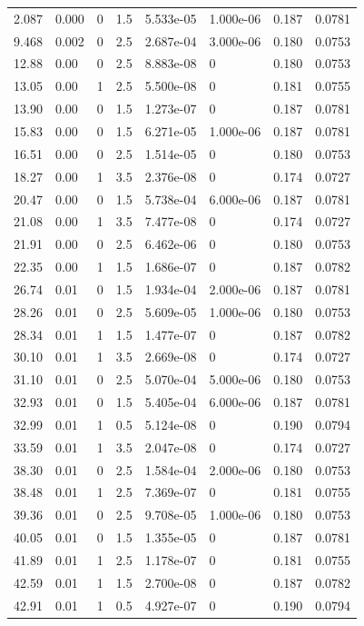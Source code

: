 \documentclass[preview]{standalone}
\begin{document}
{{\begin{tabular}{L{1.2cm}C{1.2cm} C{0.3cm}C{0.5cm} C{1.4cm}C{1.4cm} C{1.4cm}C{1.4cm}}
  2.087  &  0.000  & 0     & 1.5 &  5.533e-05  & 1.000e-06  & 0.187 &  0.0781   \\ 
  9.468  &  0.002  & 0     & 2.5 &  2.687e-04  & 3.000e-06  & 0.180 &  0.0753   \\ 
  12.88  &  0.00  & 0     & 2.5 &  8.883e-08  & 0  & 0.180 &  0.0753   \\ 
  13.05  &  0.00  & 1     & 2.5 &  5.500e-08  & 0  & 0.181 &  0.0755   \\ 
  13.90  &  0.00  & 0     & 1.5 &  1.273e-07  & 0  & 0.187 &  0.0781   \\ 
  15.83  &  0.00  & 0     & 1.5 &  6.271e-05  & 1.000e-06  & 0.187 &  0.0781   \\ 
  16.51  &  0.00  & 0     & 2.5 &  1.514e-05  & 0  & 0.180 &  0.0753   \\ 
  18.27  &  0.00  & 1     & 3.5 &  2.376e-08  & 0  & 0.174 &  0.0727   \\ 
  20.47  &  0.00  & 0     & 1.5 &  5.738e-04  & 6.000e-06  & 0.187 &  0.0781   \\ 
  21.08  &  0.00  & 1     & 3.5 &  7.477e-08  & 0  & 0.174 &  0.0727   \\ 
  21.91  &  0.00  & 0     & 2.5 &  6.462e-06  & 0  & 0.180 &  0.0753   \\ 
  22.35  &  0.00  & 1     & 1.5 &  1.686e-07  & 0  & 0.187 &  0.0782   \\ 
  26.74  &  0.01  & 0     & 1.5 &  1.934e-04  & 2.000e-06  & 0.187 &  0.0781   \\ 
  28.26  &  0.01  & 0     & 2.5 &  5.609e-05  & 1.000e-06  & 0.180 &  0.0753   \\ 
  28.34  &  0.01  & 1     & 1.5 &  1.477e-07  & 0  & 0.187 &  0.0782   \\ 
  30.10  &  0.01  & 1     & 3.5 &  2.669e-08  & 0  & 0.174 &  0.0727   \\ 
  31.10  &  0.01  & 0     & 2.5 &  5.070e-04  & 5.000e-06  & 0.180 &  0.0753   \\ 
  32.93  &  0.01  & 0     & 1.5 &  5.405e-04  & 6.000e-06  & 0.187 &  0.0781   \\ 
  32.99  &  0.01  & 1     & 0.5 &  5.124e-08  & 0  & 0.190 &  0.0794   \\ 
  33.59  &  0.01  & 1     & 3.5 &  2.047e-08  & 0  & 0.174 &  0.0727   \\ 
  38.30  &  0.01  & 0     & 2.5 &  1.584e-04  & 2.000e-06  & 0.180 &  0.0753   \\ 
  38.48  &  0.01  & 1     & 2.5 &  7.369e-07  & 0  & 0.181 &  0.0755   \\ 
  39.36  &  0.01  & 0     & 2.5 &  9.708e-05  & 1.000e-06  & 0.180 &  0.0753   \\ 
  40.05  &  0.01  & 0     & 1.5 &  1.355e-05  & 0  & 0.187 &  0.0781   \\ 
  41.89  &  0.01  & 1     & 2.5 &  1.178e-07  & 0  & 0.181 &  0.0755   \\ 
  42.59  &  0.01  & 1     & 1.5 &  2.700e-08  & 0  & 0.187 &  0.0782   \\ 
  42.91  &  0.01  & 1     & 0.5 &  4.927e-07  & 0  & 0.190 &  0.0794   \\ 
\hline 
\end{tabular} 

}}
\end{document}
